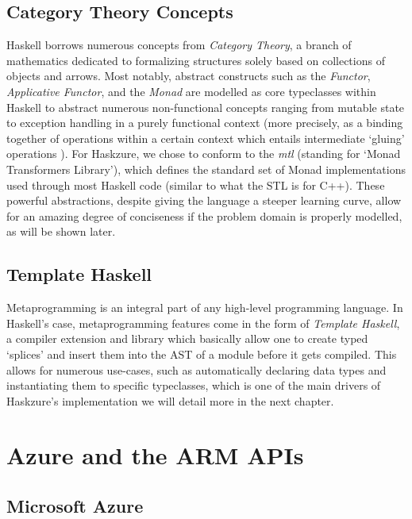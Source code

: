 \documentclass[11pt]{report}
\begin{document}
\subsection{Category Theory Concepts}

Haskell borrows numerous concepts from \textit{Category Theory}, a branch of
mathematics dedicated to formalizing structures solely based on collections of
objects and arrows. Most notably, abstract constructs such as the
\textit{Functor}, \textit{Applicative Functor}, and the \textit{Monad}
are modelled as core typeclasses within Haskell to abstract numerous
non-functional concepts ranging from mutable state to exception handling
in a purely functional context (more precisely, as a binding together
of operations within a certain context which entails intermediate `gluing'
operations \cite{learnyouahaskell}). For Haskzure, we chose
to conform to the \textit{mtl} (standing for `Monad Transformers Library'),
which defines the standard set of Monad implementations used through most
Haskell code (similar to what the STL is for C++).
These powerful abstractions, despite giving the language a steeper
learning curve, allow for an amazing degree of conciseness if the problem
domain is properly modelled, as will be shown later.

\subsection{Template Haskell}

Metaprogramming is an integral part of any high-level programming language. In
Haskell's case, metaprogramming features come in the form of \textit{Template
Haskell}, a compiler extension and library which basically allow one to create
typed `splices' and insert them into the AST of a module before it gets
compiled. This allows for numerous use-cases, such as automatically declaring
data types and instantiating them to specific typeclasses, which is one of the
main drivers of Haskzure's implementation we will detail more in the next
chapter.


\section{Azure and the ARM APIs}

\subsection{Microsoft Azure}
\end{document}
